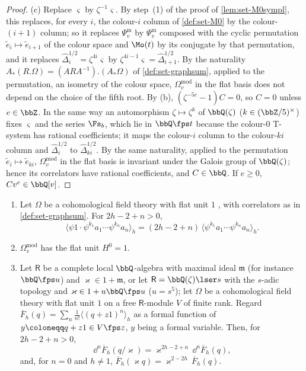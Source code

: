 \begin{proof}
(c) Replace $\varsigma$ by $\zeta^{-1}\varsigma$. By step~(1) of the proof of \cref{lem:set-M0sympl}, this replaces, for every $i$, the colour-$i$ column of \cref{def:set-M0} by the colour-$(i+1)$ column; so it replaces $\Psi^{\mathrm m}_v$ by $\Psi^{\mathrm m}_v$ composed with the cyclic permutation $\tilde e_i\mapsto\tilde e_{i+1}$ of the colour space and $\Mo(t)$ by its conjugate by that permutation, and it replaces $\hat\Delta_i^{1/2}=\zeta^{4i}\varsigma$ by $\zeta^{4i-1}\varsigma=\hat\Delta_{i+1}^{1/2}$. By the naturality $A_*(R.\Omega)=(ARA^{-1}).(A_*\Omega)$ of \cref{def:set-graphsum}, applied to the permutation, an isometry of the colour space, $\Omega^{\mathrm{mod}}_v$ in the flat basis does not depend on the choice of the fifth root. By (b), $(\zeta^{-5e}-1)C=0$, so $C=0$ unless $e\in\bbZ$. In the same way an automorphism $\zeta\mapsto\zeta^k$ of $\bbQ(\zeta)$ ($k\in(\bbZ/5)^\times$) fixes $\varsigma$ and the series $\Fs_b$, which lie in $\bbQ\fps t$ because the colour-$0$ T-system has rational coefficients; it maps the colour-$i$ column to the colour-$ki$ column and $\hat\Delta_i^{1/2}$ to $\hat\Delta_{ki}^{1/2}$. By the same naturality, applied to the permutation $\tilde e_i\mapsto\tilde e_{ki}$, $\Omega^{\mathrm{mod}}_v$ in the flat basis is invariant under the Galois group of $\bbQ(\zeta)$; hence its correlators have rational coefficients, and $C\in\bbQ$. If $e\geq0$, $Cv^e\in\bbQ[v]$.
\end{proof}

\begin{lem}
\label{lem:set-dilaton}
\begin{enumerate}
\item Let $\Omega$ be a cohomological field theory with flat unit $1$ \cite[Def.~0.3~(i)--(iii)]{PPZ15}, with correlators as in \cref{def:set-graphsum}. For $2h-2+n>0$,
\[
\langle\psi1\cdot\psi^{k_1}a_1\cdots\psi^{k_n}a_n\rangle_h=(2h-2+n)\,\langle\psi^{k_1}a_1\cdots\psi^{k_n}a_n\rangle_h .
\]
\item $\Omega^{\mathrm{mod}}_v$ has the flat unit $H^0=1$.
\item Let $\mathsf R$ be a complete local $\bbQ$-algebra with maximal ideal $\mathfrak m$ (for instance $\bbQ\fps u$) and $\varkappa\in1+\mathfrak m$, or let $\mathsf R=\bbQ(\zeta)\lser s$ with the $s$-adic topology and $\varkappa\in1+u\bbQ\fps u$ ($u=s^5$); let $\Omega$ be a cohomological field theory with flat unit $1$ on a free $\mathsf R$-module $V$ of finite rank. Regard $\overline F_h(q)=\sum_n\frac1{n!}\langle(q+z1)^n\rangle_h$ as a formal function of $y\coloneqq q+z1\in V\fps z$, $y$ being a formal variable. Then, for $2h-2+n>0$,
\[
\dd^n\overline F_h(q/\varkappa)=\varkappa^{2h-2+n}\,\dd^n\overline F_h(q),
\]
and, for $n=0$ and $h\neq1$, $\overline F_h(\varkappa q)=\varkappa^{2-2h}\,\overline F_h(q)$.
\end{enumerate}
\end{lem}


